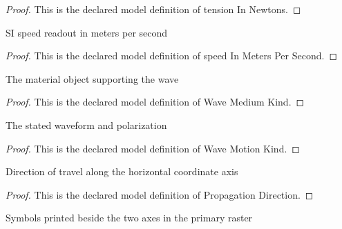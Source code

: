 \begin{proof}
  This is the declared model definition of tension In Newtons.
\end{proof}
\begin{definition}
  \label{def:physics:phyx-mini-0291:phyxminiproblems-problemphyxmini0291-speedinmeterspersecond}
  SI speed readout in meters per second
\end{definition}
\begin{proof}
  This is the declared model definition of speed In Meters Per Second.
\end{proof}
\begin{definition}
  \label{def:physics:phyx-mini-0291:phyxminiproblems-problemphyxmini0291-wavemediumkind}
  The material object supporting the wave
\end{definition}
\begin{proof}
  This is the declared model definition of Wave Medium Kind.
\end{proof}
\begin{definition}
  \label{def:physics:phyx-mini-0291:phyxminiproblems-problemphyxmini0291-wavemotionkind}
  The stated waveform and polarization
\end{definition}
\begin{proof}
  This is the declared model definition of Wave Motion Kind.
\end{proof}
\begin{definition}
  \label{def:physics:phyx-mini-0291:phyxminiproblems-problemphyxmini0291-propagationdirection}
  Direction of travel along the horizontal coordinate axis
\end{definition}
\begin{proof}
  This is the declared model definition of Propagation Direction.
\end{proof}
\begin{definition}
  \label{def:physics:phyx-mini-0291:phyxminiproblems-problemphyxmini0291-graphaxissymbol}
  Symbols printed beside the two axes in the primary raster
\end{definition}
